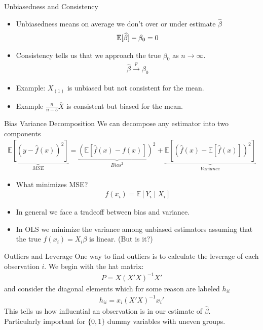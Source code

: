 \begin{frame}{Unbiasedness and Consistency}
\begin{itemize}
\item Unbiasedness means on average we don't over or under estimate $\widehat{\beta}$
\begin{align*}
\mathbb{E}[\widehat{\beta} ] - \beta_0 = 0
\end{align*}
\item Consistency tells us that we approach the true $\beta_0$ as $n \rightarrow \infty$.
\begin{align*}
\widehat{\beta}  \overset{p}{\to} \beta_0
\end{align*}
\item Example: $X_{(1)}$ is unbiased but not consistent for the mean.
\item Example $\frac{n}{n-5} \overline{X}$ is consistent but biased for the mean.
\end{itemize}
\end{frame}


\begin{frame}{Bias Variance Decomposition}
We can decompose any estimator into two components
\begin{eqnarray*}
\underbrace{\mathbb{E}[(y- \hat{f}(x))^2]}_{MSE} =\underbrace{\left( \mathbb{E}[ \hat{f}(x) - f(x)] \right)^2}_{Bias^2}  +  \underbrace{\mathbb{E} \left[ \left(  \hat{f}(x) - \mathbb{E}[\hat{f}(x)]  \right)^2 \right]}_{Variance} 
\end{eqnarray*}
\begin{itemize}
\item What minimizes MSE?
\begin{eqnarray*}
f(x_i) = \mathbb{E}[Y_i \mid X_i]  
\end{eqnarray*}
\item In general we face a tradeoff between bias and variance.
\item In OLS we minimize the variance among unbiased estimators assuming that the true $f(x_i)= X_i \beta$ is linear. (But is it?)
\end{itemize}
\end{frame}



\begin{frame}{Outliers and Leverage}
One way to find \alert{outliers} is to calculate the \alert{leverage} of each observation $i$. We begin with the \alert{hat matrix}:
\begin{align*}
P = X  (X'X)^{-1} X'
\end{align*}
and consider the diagonal elements which for some reason are labeled $h_{ii}$
\begin{align*}
h_{ii} = x_i (X'X)^{-1} x_i'
\end{align*}
This tells us how \alert{influential} an observation is in our estimate of $\widehat{\beta}$.\\
Particularly important for $\{0,1\}$ \alert{dummy variables} with uneven groups.
\end{frame}


